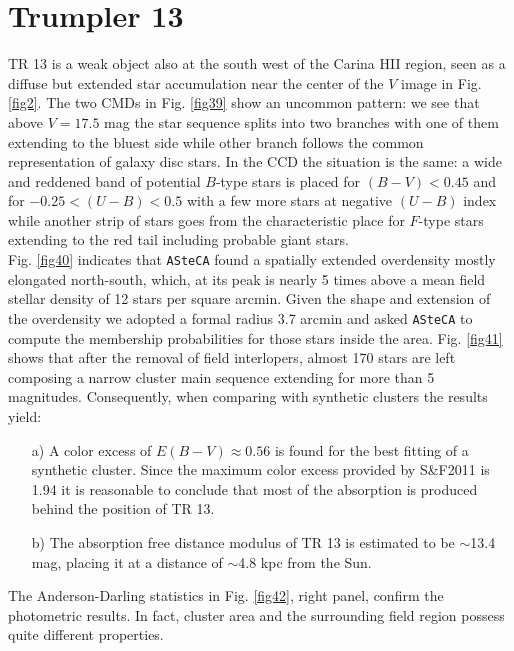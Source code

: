 \documentclass[draft]{aa}
\begin{document}
\section{Trumpler 13}

TR 13 is a weak object also at the south west of the Carina HII
region, seen as a diffuse but extended star accumulation near the center of the
$V$ image in Fig. \ref{fig2}. The two CMDs in Fig. \ref{fig39} show an uncommon
pattern: we see that above $V = 17.5$ mag the star sequence splits into two
branches with one of them extending to the bluest side while other branch
follows the common representation of galaxy disc stars.
In the CCD the situation is the same: a wide and reddened band of potential
$B$-type stars is placed for $(B-V)<0.45$ and for $-0.25<(U-B)<0.5$ with a few
more stars at negative $(U-B)$ index while another strip of stars goes from the
characteristic place for $F$-type stars extending to the red tail including
probable giant stars.\\

Fig. \ref{fig40} indicates that \texttt{ASteCA} found a spatially extended
overdensity mostly elongated north-south, which, at its peak is nearly 5 times
above a mean field stellar density of 12 stars per square arcmin. Given the
shape and extension of the overdensity we adopted a formal radius 3.7 arcmin and
asked \texttt{ASteCA} to compute the membership probabilities for those stars
inside the area. Fig. \ref{fig41} shows that after the removal of field
interlopers, almost 170 stars are left composing a narrow cluster main sequence
extending for more than 5 magnitudes. Consequently, when comparing with
synthetic clusters the results yield:

\begin{itemize}
\item [a)] A color excess of $E(B-V)\approx0.56$ is found for the best fitting
of a synthetic cluster. Since the maximum color excess provided by S\&F2011
is 1.94 it is reasonable to conclude that most of the absorption is produced
behind the position of TR 13.
\item [b)] The absorption free distance modulus of TR 13 is estimated to be
$\sim$13.4 mag, placing it at a distance of $\sim$4.8 kpc from the Sun.
\end{itemize}

The Anderson-Darling statistics in Fig. \ref{fig42}, right panel, confirm the
photometric results. In fact, cluster area and the surrounding field region
possess quite different properties.\\
\end{document}
